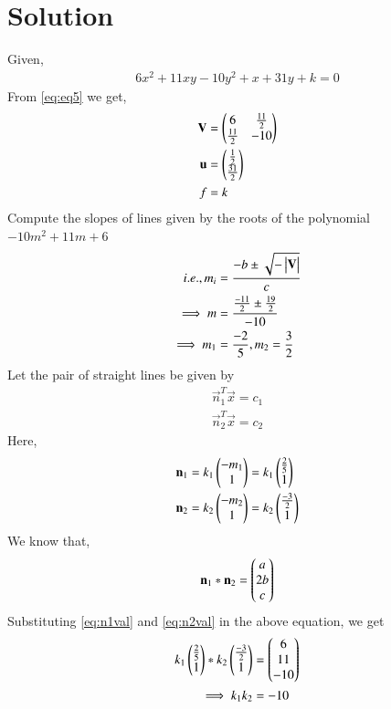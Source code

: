 \documentclass[journal,12pt,twocolumn]{IEEEtran}
\begin{document}
\section{Solution}
Given, 
\begin{align}
	6x^2 + 11xy - 10y^2 + x + 31y + k =0 \label{eq:eq5}
\end{align}
From \eqref{eq:eq5} we get,
\begin{align}
	\mathbf{V} &= \begin{pmatrix}6 & \frac{11}{2} \\ \frac{11}{2} & -10\end{pmatrix}\\
	\mathbf{u} &= \begin{pmatrix}\frac{1}{2}\\ \frac{31}{2}\end{pmatrix}\\
	f &= k
\end{align}
Compute the slopes of lines given by the roots of the polynomial $-10m^2 + 11m + 6$
\begin{align}
   i.e., m_i &= \frac{-b \pm \sqrt{- \begin{vmatrix}\mathbf{V}\end{vmatrix}}}{c} \label{eq:eq2} \\
   \implies m &= \frac{\frac{-11}{2} \pm \frac{19}{2}}{-10} \\ 
   \implies m_1 &= \frac{-2}{5}, m_2 = \frac{3}{2} 
\end{align} 
Let the pair of straight lines be given by 
\begin{align}
	\vec{n}_1^T\vec{x} = c_1 \label{eq:n_1}\\
	\vec{n}_2^T\vec{x} = c_2 \label{eq:n_2}
\end{align}
Here,
\begin{align}
	\mathbf{n}_1 &= k_1\begin{pmatrix}-m_1\\1\end{pmatrix} = k_1 \begin{pmatrix} \frac{2}{5} \\ 1\end{pmatrix}  \label{eq:n1val}\\
	\mathbf{n}_2 &= k_2\begin{pmatrix}-m_2\\1\end{pmatrix} = k_2 \begin{pmatrix}\frac{-3}{2} \\ 1\end{pmatrix} \label{eq:n2val}
\end{align}
We know that, 
\begin{align}
	\mathbf{n}_1 * \mathbf{n}_2 = \begin{pmatrix}a\\2b\\c\end{pmatrix} \label{eq:n1n2}
\end{align}
Substituting \eqref{eq:n1val} and \eqref{eq:n2val} in the above equation, we get
\begin{align}
	k_1 \begin{pmatrix} \frac{2}{5} \\ 1\end{pmatrix} * k_2 \begin{pmatrix}\frac{-3}{2} \\ 1\end{pmatrix} &= \begin{pmatrix}6\\ 11\\ -10\end{pmatrix}\\
	\implies k_1k_2 &= -10
\end{align} 
\end{document}
